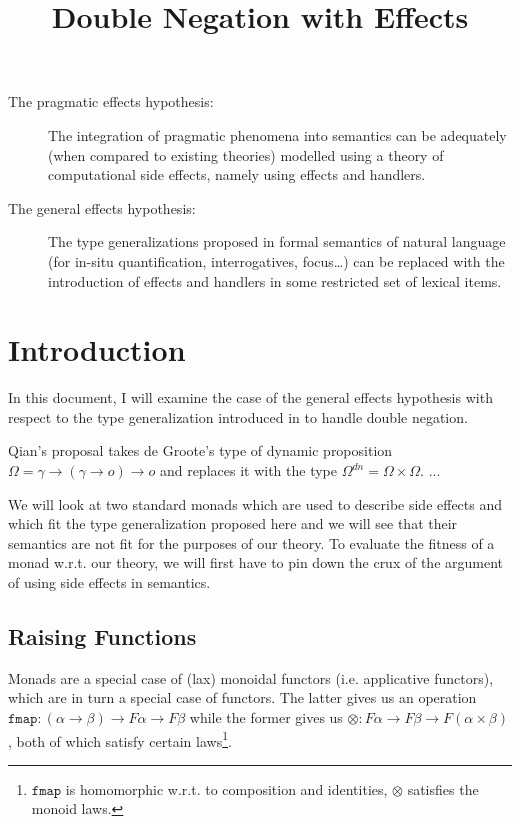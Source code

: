\documentclass[a4paper,11pt,DIV=12]{scrartcl}
\title{Double Negation with Effects}
\date{}
\begin{document}
\maketitle

\begin{description}
  \item[The pragmatic effects hypothesis:] The integration of pragmatic
    phenomena into semantics can be adequately (when compared to existing
    theories) modelled using a theory of computational side effects, namely
    using effects and handlers.

  \item[The general effects hypothesis:] The type generalizations proposed
    in formal semantics of natural language (for in-situ quantification,
    interrogatives, focus\ldots) can be replaced with the introduction of
    effects and handlers in some restricted set of lexical items.
\end{description}

\section{Introduction}

In this document, I will examine the case of the general effects hypothesis
with respect to the type generalization introduced in
\cite{saiaccessibilite} to handle double negation.

Qian's proposal takes de Groote's type of dynamic proposition $\Omega =
\gamma \to (\gamma \to o) \to o$ and replaces it with the type $\Omega^{dn}
= \Omega \times \Omega$. ...

We will look at two standard monads which are used to describe side effects
and which fit the type generalization proposed here and we will see that
their semantics are not fit for the purposes of our theory. To evaluate the
fitness of a monad w.r.t. our theory, we will first have to pin down the
crux of the argument of using side effects in semantics.

\subsection{Raising Functions}

Monads are a special case of (lax) monoidal functors (i.e. applicative
functors), which are in turn a special case of functors. The latter gives
us an operation $\texttt{fmap} : (\alpha \to \beta) \to F \alpha \to F
\beta$ while the former gives us $\otimes : F \alpha \to F \beta \to F
(\alpha \times \beta)$, both of which satisfy certain
laws\footnote{$\texttt{fmap}$ is homomorphic w.r.t. to composition and
  identities, $\otimes$ satisfies the monoid laws.}.
\end{document}
